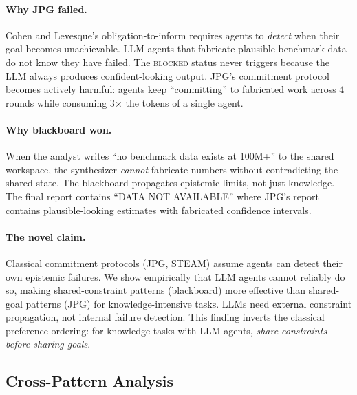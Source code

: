 \documentclass{article}
\begin{document}
\paragraph{Why JPG failed.}
Cohen and Levesque's obligation-to-inform requires agents to \emph{detect} when their
goal becomes unachievable. LLM agents that fabricate plausible benchmark data do not
know they have failed. The \textsc{blocked} status never triggers because the LLM
always produces confident-looking output. JPG's commitment protocol becomes actively
harmful: agents keep ``committing'' to fabricated work across 4 rounds while consuming
3$\times$ the tokens of a single agent.

\paragraph{Why blackboard won.}
When the analyst writes ``no benchmark data exists at 100M+'' to the shared workspace,
the synthesizer \emph{cannot} fabricate numbers without contradicting the shared state.
The blackboard propagates epistemic limits, not just knowledge. The final report
contains ``DATA NOT AVAILABLE'' where JPG's report contains plausible-looking estimates
with fabricated confidence intervals.

\paragraph{The novel claim.}
Classical commitment protocols (JPG, STEAM) assume agents can detect their own
epistemic failures. We show empirically that LLM agents cannot reliably do so, making
shared-constraint patterns (blackboard) more effective than shared-goal patterns (JPG)
for knowledge-intensive tasks. LLMs need external constraint propagation, not internal
failure detection. This finding inverts the classical preference ordering: for knowledge
tasks with LLM agents, \emph{share constraints before sharing goals}.

\subsection{Cross-Pattern Analysis}
\label{sec:exp-cross}

%
%
%
%
\end{document}
